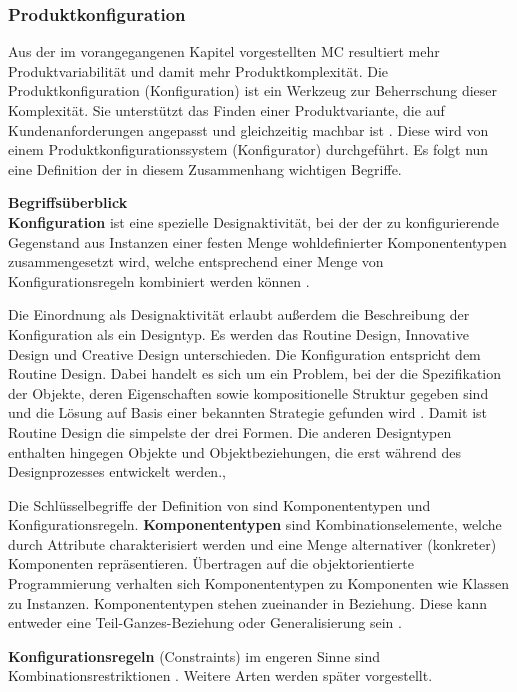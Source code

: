 \documentclass[12pt,a4paper,bibliography=totocnumbered,listof=totoc]{scrartcl}
\begin{document}
\subsubsection{Produktkonfiguration}
 \label{subssubsection:Produktkonfiguration}
 
Aus der im vorangegangenen Kapitel vorgestellten \ac{MC} resultiert mehr Produktvariabilität und damit mehr Produktkomplexität. Die Produktkonfiguration (Konfiguration) ist ein Werkzeug zur Beherrschung dieser Komplexität. Sie unterstützt das Finden einer Produktvariante, die auf Kundenanforderungen angepasst und gleichzeitig machbar ist \citep{lutz11}. Diese wird von einem Produktkonfigurationssystem (Konfigurator) durchgeführt. Es folgt nun eine Definition der in diesem Zusammenhang wichtigen Begriffe.

\textbf{Begriffsüberblick}\\
\textbf{Konfiguration} ist eine spezielle Designaktivität, bei der der zu konfigurierende Gegenstand aus Instanzen einer festen Menge wohldefinierter Komponententypen zusammengesetzt wird, welche entsprechend einer Menge von Konfigurationsregeln kombiniert werden können \citep{sabin98}.

Die Einordnung als Designaktivität erlaubt außerdem die Beschreibung der Konfiguration als ein Designtyp. Es werden das \glqq Routine Design\grqq{}, \glqq Innovative Design\grqq{} und \glqq Creative Design\grqq{} unterschieden. Die Konfiguration entspricht dem \glqq Routine Design\grqq{}. Dabei handelt es sich um ein Problem, bei der die Spezifikation der Objekte, deren Eigenschaften sowie kompositionelle Struktur gegeben sind und die Lösung auf Basis einer bekannten Strategie gefunden wird \citep{brown89}. Damit ist \glqq Routine Design\grqq{} die simpelste der drei Formen. Die anderen Designtypen enthalten hingegen Objekte und Objektbeziehungen, die erst während des Designprozesses entwickelt werden., 

Die Schlüsselbegriffe der Definition von \citeauthor{sabin98} sind Komponententypen und Konfigurationsregeln. \textbf{Komponententypen} sind Kombinationselemente, welche durch Attribute charakterisiert werden und eine Menge alternativer (konkreter) Komponenten repräsentieren. Übertragen auf die objektorientierte Programmierung verhalten sich Komponententypen zu Komponenten wie Klassen zu Instanzen. Komponententypen stehen zueinander in Beziehung. Diese kann entweder eine \glqq Teil-Ganzes\grqq{}-Beziehung oder Generalisierung sein \citep{felferning14}. 

\textbf{Konfigurationsregeln} (Constraints) im engeren Sinne sind Kombinationsrestriktionen \citep{felferning14}. Weitere Arten werden später vorgestellt.
\end{document}
